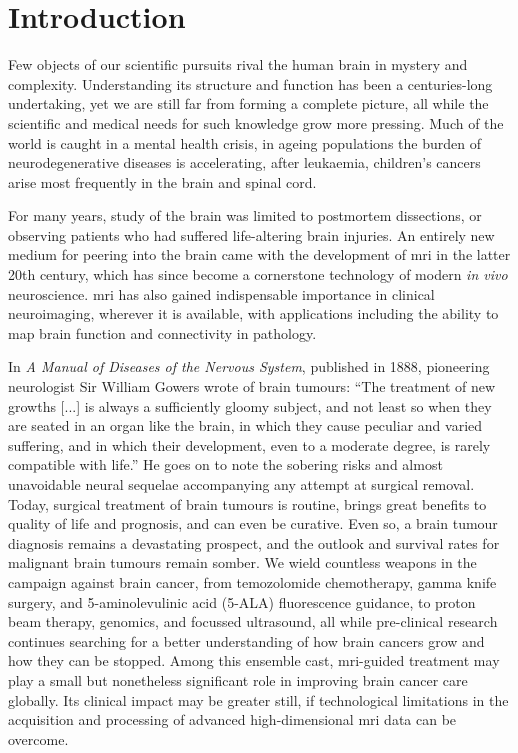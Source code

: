 \chapter*{Introduction}
\label{chapterlabel0}

Few objects of our scientific pursuits rival the human brain in mystery and complexity.
Understanding its structure and function has been a centuries-long undertaking, yet we are still far from forming a complete picture, all while the scientific and medical needs for such knowledge grow more pressing.
Much of the world is caught in a mental health crisis\autocite{Patel2018,Liu2020,Yang2021a}, in ageing populations the burden of neurodegenerative diseases is accelerating\autocite{Deuschl2020,Li2022}, after leukaemia, children's cancers arise most frequently in the brain and spinal cord\autocite{Ostrom2015}.

For many years, study of the brain was limited to postmortem dissections, or observing patients who had suffered life-altering brain injuries.
An entirely new medium for peering into the brain came with the development of \gls{mri} in the latter 20th century, which has since become a cornerstone technology of modern \textit{in vivo} neuroscience.
\Gls{mri} has also gained indispensable importance in clinical neuroimaging, wherever it is available\autocite{Geethanath2019}, with applications including the ability to map brain function and connectivity in pathology.

In \textit{A Manual of Diseases of the Nervous System}, published in 1888, pioneering neurologist Sir William Gowers wrote of brain tumours:
``The treatment of new growths [...] is always a sufficiently gloomy subject, and not least so when they are seated in an organ like the brain, in which they cause peculiar and varied suffering, and in which their development, even to a moderate degree, is rarely compatible with life.''\autocite{Gowers1888}
He goes on to note the sobering risks and almost unavoidable neural sequelae accompanying any attempt at surgical removal.
Today, surgical treatment of brain tumours is routine, brings great benefits to quality of life and prognosis, and can even be curative.
Even so, a brain tumour diagnosis remains a devastating prospect, and the outlook and survival rates for malignant brain tumours remain somber\autocite{Aldape2019}.
We wield countless weapons in the campaign against brain cancer, from temozolomide chemotherapy, gamma knife surgery, and 5-aminolevulinic acid (5-ALA) fluorescence guidance, to proton beam therapy, genomics, and focussed ultrasound, all while pre-clinical research continues searching for a better understanding of how brain cancers grow and how they can be stopped.
Among this ensemble cast, \gls{mri}-guided treatment may play a small but nonetheless significant role in improving brain cancer care globally.
Its clinical impact may be greater still, if technological limitations in the acquisition and processing of advanced high-dimensional \gls{mri} data can be overcome.

